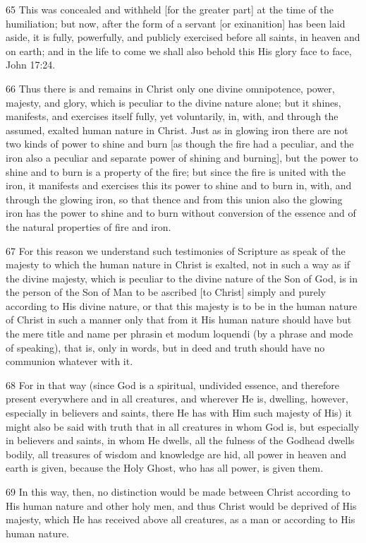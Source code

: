 {65 This was concealed and withheld [for the greater part] at the time of the humiliation; but now, after the form of a servant [or exinanition] has been laid aside, it is fully, powerfully, and publicly exercised before all saints, in heaven and on earth; and in the life to come we shall also behold this His glory face to face, John 17:24.

66 Thus there is and remains in Christ only one divine omnipotence, power, majesty, and glory, which is peculiar to the divine nature alone; but it shines, manifests, and exercises itself fully, yet voluntarily, in, with, and through the assumed, exalted human nature in Christ. Just as in glowing iron there are not two kinds of power to shine and burn [as though the fire had a peculiar, and the iron also a peculiar and separate power of shining and burning], but the power to shine and to burn is a property of the fire; but since the fire is united with the iron, it manifests and exercises this its power to shine and to burn in, with, and through the glowing iron, so that thence and from this union also the glowing iron has the power to shine and to burn without conversion of the essence and of the natural properties of fire and iron.

67 For this reason we understand such testimonies of Scripture as speak of the majesty to which the human nature in Christ is exalted, not in such a way as if the divine majesty, which is peculiar to the divine nature of the Son of God, is in the person of the Son of Man to be ascribed [to Christ] simply and purely according to His divine nature, or that this majesty is to be in the human nature of Christ in such a manner only that from it His human nature should have but the mere title and name per phrasin et modum loquendi (by a phrase and mode of speaking), that is, only in words, but in deed and truth should have no communion whatever with it.

68 For in that way (since God is a spiritual, undivided essence, and therefore present everywhere and in all creatures, and wherever He is, dwelling, however, especially in believers and saints, there He has with Him such majesty of His) it might also be said with truth that in all creatures in whom God is, but especially in believers and saints, in whom He dwells, all the fulness of the Godhead dwells bodily, all treasures of wisdom and knowledge are hid, all power in heaven and earth is given, because the Holy Ghost, who has all power, is given them.

69 In this way, then, no distinction would be made between Christ according to His human nature and other holy men, and thus Christ would be deprived of His majesty, which He has received above all creatures, as a man or according to His human nature.

}
